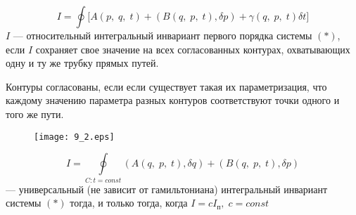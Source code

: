 \begin{df}
	\[
		I = \oint\big[A(p,\; q,\; t) + (B(q,\; p, \; t), \delta p) + \gamma(q,\; p, \; t)\delta t\big]
	\]
	$I$ --- относительный интегральный инвариант первого порядка системы $(*)$, если $I$ сохраняет свое значение на всех согласованных контурах, охватывающих одну и ту же трубку прямых путей.
\end{df}
\begin{df}
	Контуры согласованы, если если существует такая их параметризация, что каждому значению параметра разных контуров соответствуют точки одного и того же пути.
\end{df}
\begin{figure}[H]
	\texttt{[image: 9\_2.eps]}
\end{figure}

\begin{teo}
	\[ 
		I = \oint\limits_{C: t = const} (A(q,\; p,\; t), \delta q) + (B(q,\; p, \; t), \delta p)
	\] 
	--- универсальный (не зависит от гамильтониана) интегральный инвариант системы $(*)$ тогда, и только тогда, когда $I = cI_\text{п},\; c = const$
\end{teo}
